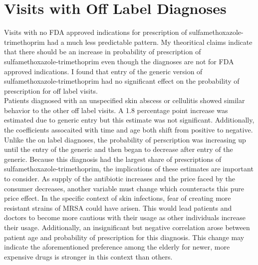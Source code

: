 \section{Visits with Off Label Diagnoses}
\indent Visits with no FDA approved indications for prescription of sulfamethoxazole-trimethoprim had a much less predictable pattern. My theoritical claims indicate that there should be an increase in probability of prescription of sulfamethoxazole-trimethoprim even though the diagnoses are not for FDA approved indications. I found that entry of the generic version of sulfamethoxazole-trimethoprim had no significant effect on the probability of prescription for off label visits.\\
\indent Patients diagnosed with an unspecified skin abscess or cellulitis showed similar behavior to the other off label visits. A 1.8 percentage point increase was estimated due to generic entry but this estimate was not significant. Additionally, the coefficients assocaited with time and age both shift from positive to negative. Unlike the on label diagnoses, the probability of perscription was increasing up until the entry of the generic and then began to decrease after entry of the generic. Because this diagnosis had the largest share of prescriptions of sulfamethoxazole-trimethoprim, the implications of these estimates are important to consider. As supply of the antibiotic increases and the price faced by the consumer decreases, another variable must change which counteracts this pure price effect. In the specific context of skin infections, fear of creating more resistant strains of MRSA could have arisen. This would lead patients and doctors to become more cautious with their usage as other individuals increase their usage. Additionally, an insignificant but negative correlation arose between patient age and probability of prescription for this diagnosis. This change may indicate the aforementioned preference among the elderly for newer, more expensive drugs \cite{kianmehr_system_2020} is stronger in this context than others.